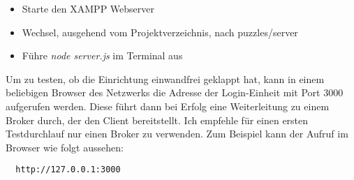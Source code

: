 \documentclass[]{article}
\begin{document}
\begin{itemize}
  \item Starte den XAMPP Webserver
  \item Wechsel, ausgehend vom Projektverzeichnis, nach puzzles/server
  \item Führe \emph{node server.js} im Terminal aus
\end{itemize}

Um zu testen, ob die Einrichtung einwandfrei geklappt hat, kann in einem beliebigen Browser des Netzwerks
die Adresse der Login-Einheit mit Port 3000 aufgerufen werden. Diese führt dann bei Erfolg eine Weiterleitung zu
einem Broker durch, der den Client bereitstellt. Ich empfehle für einen ersten Testdurchlauf nur einen Broker zu verwenden. 
Zum Beispiel kann der Aufruf im Browser wie folgt aussehen:

\begin{verbatim}
  http://127.0.0.1:3000
\end{verbatim}





\end{document}
